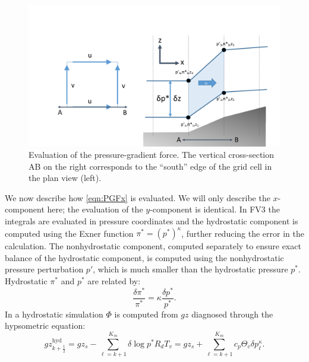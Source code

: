 \documentclass[10pt,letterpaper,margin=1in]{memoir}
\newcommand{\half}{\frac{1}{2}}
\begin{document}
\begin{figure}[htbp] %
   \centering
   \includegraphics[scale=0.5]{PGF.pdf} 
   \caption{Evaluation of the pressure-gradient force. The vertical cross-section AB on the right corresponds to the ``south'' edge of the grid cell in the plan view (left).}
   \label{fig:PGF}
\end{figure}

We now describe how \eqref{eqn:PGFx} is evaluated. We will only describe the $x$-component here; the evaluation of the $y$-component is identical. In FV3 the integrals are evaluated in pressure coordinates and the hydrostatic component is computed using the Exner function $\pi^* = \left (p^*\right)^\kappa$, further reducing the error in the calculation. The nonhydrostatic component, computed separately to ensure exact balance of the hydrostatic component, is  computed using the nonhydrostatic pressure perturbation $p'$, which is much smaller than the hydrostatic pressure $p^*$. Hydrostatic $\pi^*$ and $p^*$ are related by:
\begin{equation} \label{eqn:pipressure}
\frac{\delta \pi^*}{\pi^*} = \kappa \frac{\delta p^*}{p^*}.
\end{equation}
In a hydrostatic simulation $\Phi$ is computed from $gz$ diagnosed through the hypsometric equation: 
\begin{equation} \label{eqn:hypso}
gz^{\text{hyd}}_{k+\half} = g z_s - \sum_{\ell=k+1}^{K_m} \delta \log p^* R_d T_v = g z_s + \sum_{\ell=k+1}^{K_m} c_p \Theta_v \delta p^\kappa_\ell.
\end{equation}
\end{document}

